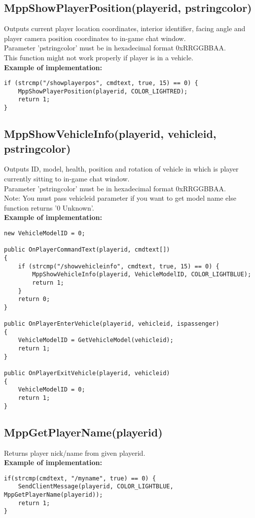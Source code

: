 \documentclass{article}
\begin{document}
\newpage
\subsection{MppShowPlayerPosition(playerid, pstringcolor)}
Outputs current player location coordinates, interior identifier, facing angle and player camera position coordinates to in-game chat window.
\\Parameter 'pstringcolor' must be in hexadecimal format 0xRRGGBBAA.
\\This function might not work properly if player is in a vehicle.
\bigskip
\\\textbf{Example of implementation:}
\begin{verbatim}
if (strcmp("/showplayerpos", cmdtext, true, 15) == 0) {
    MppShowPlayerPosition(playerid, COLOR_LIGHTRED);
    return 1;
}
\end{verbatim}


\subsection{MppShowVehicleInfo(playerid, vehicleid, pstringcolor)}
Outputs ID, model, health, position and rotation of vehicle in which is player currently sitting to in-game chat window.
\\Parameter 'pstringcolor' must be in hexadecimal format 0xRRGGBBAA.
\\Note: You must pass vehicleid parameter if you want to get model name else function returns '0 Unknown'.
\bigskip
\\\textbf{Example of implementation:}
\begin{verbatim}
new VehicleModelID = 0;

public OnPlayerCommandText(playerid, cmdtext[])
{
    if (strcmp("/showvehicleinfo", cmdtext, true, 15) == 0) {
        MppShowVehicleInfo(playerid, VehicleModelID, COLOR_LIGHTBLUE);
        return 1;
    }
    return 0;
}

public OnPlayerEnterVehicle(playerid, vehicleid, ispassenger)
{
    VehicleModelID = GetVehicleModel(vehicleid);
    return 1;
}

public OnPlayerExitVehicle(playerid, vehicleid)
{
    VehicleModelID = 0;
    return 1;
}
\end{verbatim}


\subsection{MppGetPlayerName(playerid)}
Returns player nick/name from given playerid.
\bigskip
\\\textbf{Example of implementation:}
\begin{verbatim}
if(strcmp(cmdtext, "/myname", true) == 0) {
    SendClientMessage(playerid, COLOR_LIGHTBLUE, MppGetPlayerName(playerid));
    return 1;
}
\end{verbatim}
\end{document}
